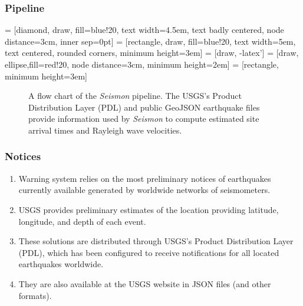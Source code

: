 \documentclass[ignorenonframetext,t,10pt]{beamer}
\begin{document}
\begin{frame}
\frametitle{Pipeline}

 = [diamond, draw, fill=blue!20,
    text width=4.5em, text badly centered, node distance=3cm, inner sep=0pt]
 = [rectangle, draw, fill=blue!20,
    text width=5em, text centered, rounded corners, minimum height=3em]
 = [draw, -latex']
 = [draw, ellipse,fill=red!20, node distance=3cm,
    minimum height=2em]
 = [rectangle, minimum height=3em]

\begin{figure}[t]
 \begin{center}
 \end{center}
 \caption{A flow chart of the \emph{Seismon} pipeline. The USGS's Product Distribution Layer (PDL) and public GeoJSON earthquake files provide information used by \emph{Seismon} to compute estimated site arrival times and Rayleigh wave velocities.}
 \label{fig:flowchart}
\end{figure}
\end{frame}

\begin{frame}
\frametitle{Notices}

  \begin{enumerate}
\item Warning system relies on the most preliminary notices of earthquakes currently available generated by worldwide networks of seismometers. 
\item USGS provides preliminary estimates of the location providing latitude, longitude, and depth of each event.
\item These solutions are distributed through USGS's Product Distribution Layer (PDL), which has been configured to receive notifications for all located earthquakes worldwide. 
\item They are also available at the USGS website in JSON files (and other formats).
  \end{enumerate}
\end{frame}
\end{document}
